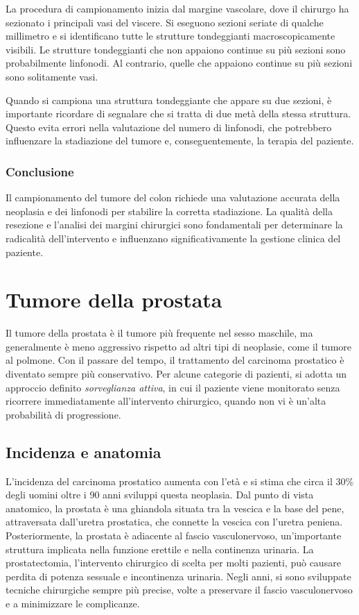 La procedura di campionamento inizia dal margine vascolare, dove il chirurgo ha sezionato i principali vasi del viscere. Si eseguono sezioni seriate di qualche millimetro e si identificano tutte le strutture tondeggianti macroscopicamente visibili. Le strutture tondeggianti che non appaiono continue su più sezioni sono probabilmente linfonodi. Al contrario, quelle che appaiono continue su più sezioni sono solitamente vasi.

Quando si campiona una struttura tondeggiante che appare su due sezioni, è importante ricordare di segnalare che si tratta di due metà della stessa struttura. Questo evita errori nella valutazione del numero di linfonodi, che potrebbero influenzare la stadiazione del tumore e, conseguentemente, la terapia del paziente.

\subsubsection{Conclusione}
Il campionamento del tumore del colon richiede una valutazione accurata della neoplasia e dei linfonodi per stabilire la corretta stadiazione. La qualità della resezione e l'analisi dei margini chirurgici sono fondamentali per determinare la radicalità dell'intervento e influenzano significativamente la gestione clinica del paziente.

\section{Tumore della prostata}
Il tumore della prostata è il tumore più frequente nel sesso maschile, ma generalmente è meno aggressivo rispetto ad altri tipi di neoplasie, come il tumore al polmone. Con il passare del tempo, il trattamento del carcinoma prostatico è diventato sempre più conservativo. Per alcune categorie di pazienti, si adotta un approccio definito \textit{sorveglianza attiva}, in cui il paziente viene monitorato senza ricorrere immediatamente all'intervento chirurgico, quando non vi è un'alta probabilità di progressione.

\subsection{Incidenza e anatomia}
L'incidenza del carcinoma prostatico aumenta con l'età e si stima che circa il 30\% degli uomini oltre i 90 anni sviluppi questa neoplasia. Dal punto di vista anatomico, la prostata è una ghiandola situata tra la vescica e la base del pene, attraversata dall'uretra prostatica, che connette la vescica con l'uretra peniena. Posteriormente, la prostata è adiacente al fascio vasculonervoso, un'importante struttura implicata nella funzione erettile e nella continenza urinaria. La prostatectomia, l'intervento chirurgico di scelta per molti pazienti, può causare perdita di potenza sessuale e incontinenza urinaria. Negli anni, si sono sviluppate tecniche chirurgiche sempre più precise, volte a preservare il fascio vasculonervoso e a minimizzare le complicanze.

